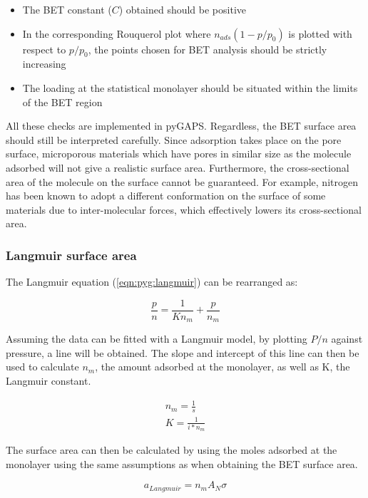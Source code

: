 \begin{itemize}

	\item The BET constant (\(C\)) obtained should be positive
    \item In the corresponding Rouquerol plot where \(n_{ads}(1-p/p_0)\)
    is plotted with respect to \(p/p_0\), the points chosen for BET
	analysis should be strictly increasing
	\item The loading at the statistical monolayer should be
	situated within the limits of the BET region

\end{itemize}

All these checks are implemented in pyGAPS.
Regardless, the BET surface area should still be interpreted carefully.
Since adsorption takes place on the pore surface, microporous materials
which have pores in similar size as the molecule adsorbed will not
give a realistic surface area. Furthermore, the cross-sectional area
of the molecule on the surface cannot be guaranteed. For example, 
nitrogen has been known to adopt a different conformation on the surface
of some materials due to inter-molecular forces, which effectively
lowers its cross-sectional area.

\subsubsection{Langmuir surface area}

The Langmuir equation (\ref{eqn:pyg:langmuir}) can be rearranged as:

\begin{equation}
	\frac{p}{n} = \frac{1}{K n_m} + \frac{p}{n_m}
\end{equation}

Assuming the data can be fitted with a Langmuir model, by plotting
\({P}/{n}\) against pressure, a line will be obtained. The slope and
intercept of this line can then be used to calculate \(n_{m}\),
the amount adsorbed at the monolayer, as well as K, the Langmuir constant.

\begin{gather}
	n_m = \frac{1}{s} \\
	K = \frac{1}{i * n_m}
\end{gather}

The surface area can then be calculated by using the moles adsorbed at the
monolayer using the same assumptions as when obtaining the BET surface area.

\begin{equation}
	a_{Langmuir} = n_m A_N \sigma
\end{equation}

